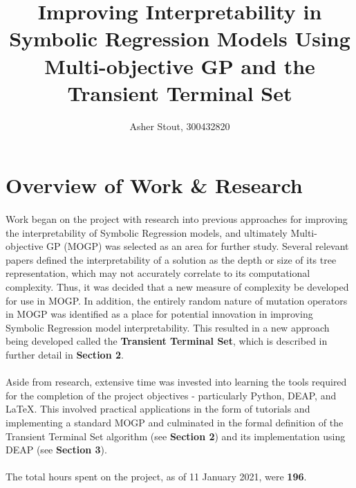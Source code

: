 \documentclass[a4paper]{article}
\title{Improving Interpretability in Symbolic Regression Models Using Multi-objective GP and the Transient Terminal Set}
\author{Asher Stout, 300432820}
\begin{document}
\maketitle

\section{Overview of Work \& Research}
\paragraph{} Work began on the project with research into previous approaches for improving the interpretability of Symbolic Regression models, and ultimately Multi-objective GP (MOGP) was selected as an area for further study. Several relevant papers defined the interpretability of a solution as the depth or size of its tree representation, which may not accurately correlate to its computational complexity. Thus, it was decided that a new measure of complexity be developed for use in MOGP. In addition, the entirely random nature of mutation operators in MOGP was identified as a place for potential innovation in improving Symbolic Regression model interpretability. This resulted in a new approach being developed called the \textbf{Transient Terminal Set}, which is described in further detail in \textbf{Section 2}.
\paragraph{} Aside from research, extensive time was invested into learning the tools required for the completion of the project objectives - particularly Python, DEAP, and LaTeX. This involved practical applications in the form of tutorials and implementing a standard MOGP and culminated in the formal definition of the Transient Terminal Set algorithm (see \textbf{Section 2}) and its implementation using DEAP (see \textbf{Section 3}). 
\paragraph{}The total hours spent on the project, as of 11 January 2021, were \textbf{196}.

\end{document}
